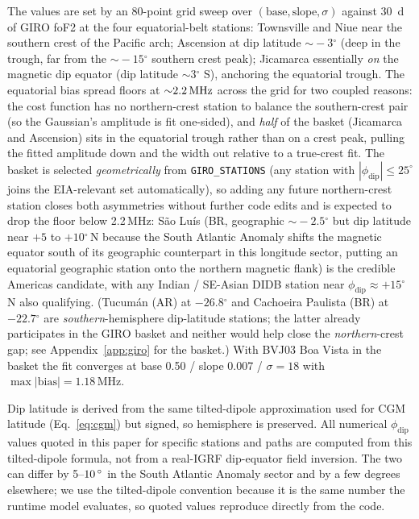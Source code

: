 \documentclass[11pt,a4paper]{article}
\newcommand{\SI}[2]{#1\,\text{#2}}
\newcommand{\MHz}{\text{MHz}}
\newcommand{\degree}{\ensuremath{{}^\circ}}
\begin{document}
The values are set by an 80-point grid sweep over
$(\text{base}, \text{slope}, \sigma)$ against 30~d of GIRO foF2 at
the four equatorial-belt stations: Townsville and Niue near the
southern crest of the Pacific arch; Ascension at dip latitude
${\sim}\!-3\degree$ (deep in the trough, far from the
$\sim\!-15\degree$ southern crest peak); Jicamarca essentially
\emph{on} the magnetic dip equator (dip latitude ${\sim}\!3\degree$
S), anchoring the equatorial trough.  The equatorial bias spread
floors at ${\sim}\SI{2.2}{\MHz}$ across the grid for two coupled
reasons: the cost function has no northern-crest station to
balance the southern-crest pair (so the Gaussian's amplitude is
fit one-sided), and \emph{half} of the basket (Jicamarca and
Ascension) sits in the equatorial trough rather than on a
crest peak, pulling the fitted amplitude down and the width out
relative to a true-crest fit.  The basket is selected
\emph{geometrically} from \texttt{GIRO\_STATIONS} (any station with
$|\phi_{\text{dip}}| \le 25^\circ$ joins the EIA-relevant set
automatically), so adding any future northern-crest station
closes both asymmetries without further code
edits and is expected to drop the floor below 2.2\,MHz:
S\~ao Lu\'is (BR, geographic ${\sim}\!-2.5\degree$ but dip
latitude near $+5$ to $+10\degree$\,N because the South Atlantic
Anomaly shifts the magnetic equator south of its geographic
counterpart in this longitude sector, putting an equatorial
geographic station onto the northern magnetic flank) is the
credible Americas candidate, with any Indian /
SE-Asian DIDB station near $\phi_{\text{dip}} \approx +15\degree$\,N
also qualifying.  (Tucum\'an
(AR) at $-26.8\degree$ and Cachoeira Paulista (BR) at $-22.7\degree$
are \emph{southern}-hemisphere dip-latitude stations; the latter
already participates in the GIRO basket and neither would help
close the \emph{northern}-crest gap; see Appendix~\ref{app:giro}
for the basket.)  With BVJ03 Boa Vista in the basket the
fit converges at base 0.50 / slope 0.007 / $\sigma = 18$ with
$\max|\text{bias}| = 1.18$\,MHz.

Dip latitude is derived from the same tilted-dipole approximation
used for CGM latitude (Eq.~\ref{eq:cgm}) but signed, so hemisphere
is preserved.  All numerical $\phi_{\text{dip}}$ values quoted in
this paper for specific stations and paths are computed from this
tilted-dipole formula, not from a real-IGRF dip-equator field
inversion.  The two can differ by 5--$\SI{10}{\degree}$ in the
South Atlantic Anomaly sector and by a few degrees elsewhere; we
use the tilted-dipole convention because it is the same number the
runtime model evaluates, so quoted values reproduce directly from
the code.
\end{document}
